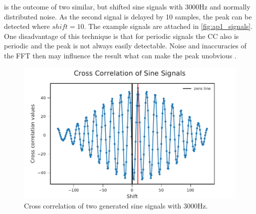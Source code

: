  is the outcome of two similar, but shifted sine signals with
3000\si{Hz} and normally distributed noise.
As the second signal is delayed by 10 samples, the peak can be detected where $shift = 10$.
The example signals are attached in \cref{fig:ap1_signals}.
One disadvantage of this technique is that for periodic signals the \ac{CC} also is periodic
and the peak is not always easily detectable. Noise and inaccuracies of the \ac{FFT} then
may influence the result what can make the peak unobvious \cite{L_L_GCC}.
\begin{figure}[ht]
	\centering
		\includegraphics[width=1\columnwidth]{figures/CC_theory}
	\caption{Cross correlation of two generated sine signals with 3000Hz.}
    \label{fig:03_ccTheory}
\end{figure}
